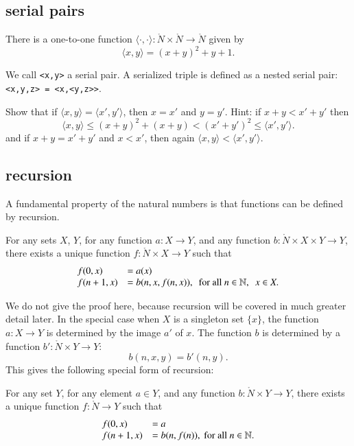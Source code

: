 \subsection{serial pairs}

\begin{lemma}
There is a one-to-one function $\langle\cdot,\cdot\rangle:\ring{N}\times\ring{N}\to\ring{N}$ given by
$$
\langle x,y\rangle = (x+y)^2 + y + 1.
$$
\end{lemma}
We call \verb!<x,y>! a serial pair. A serialized triple is defined as a nested serial pair: \verb!<x,y,z> = <x,<y,z>>!.

\begin{exer} Show that if $\langle x,y\rangle = \langle x',y'\rangle$, then $x=x'$ and $y=y'$.
Hint: if $x+y < x'+y'$ then 
$$
\langle x,y\rangle\le (x+y)^2+(x+y) < (x'+y')^2 \le \langle x',y'\rangle.
$$
and if $x+y=x'+y'$ and $x<x'$, then again $\langle x,y\rangle < \langle x',y'\rangle$.
\end{exer}



\subsection{recursion}

A fundamental property of the natural numbers is that functions can be
defined by recursion.


\begin{assert}[recursion]  For any sets $X$, $Y$, for any function $a:X\to Y$, and any function $b:\ring{N}\times X\times Y\to Y$, there exists a unique function $f:\ring{N}\times X\to Y$ such that
$$
\begin{array}{lll}
f(0,x) &= a(x)\\
f(n+1,x) &= b(n,x,f(n,x)),~\hbox{ for all } n\in\mathbb{N},~~ x\in X.
\end{array}
$$
\end{assert}

We do not give the proof here, because recursion will be covered in much greater detail later.  In the special case when $X$ is a singleton set $\{x\}$, the function $a:X\to Y$ is determined by the image $a'$ of $x$.  The function $b$ is determined by a function $b':\ring{N}\times Y\to Y$:
$$
b(n,x,y) = b'(n,y).
$$
This gives the following special form of recursion:

\begin{assert}  For any set $Y$, for any element $a\in Y$, and any function $b:\ring{N}\times Y\to Y$, there exists a unique function $f:\ring{N}\to Y$ such that
$$
\begin{array}{lll}
f(0,x) &= a\\
f(n+1,x) &= b(n,f(n)),\hbox{ for all } n\in\mathbb{N}.
\end{array}
$$
\end{assert}



